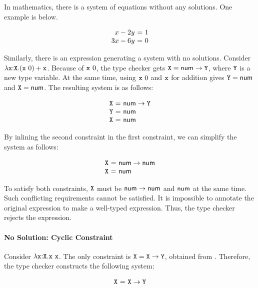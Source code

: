 In mathematics, there is a system of equations without any solutions. One
example is below.

\[
\begin{array}{r@{~}c@{~}l}
  x - 2y &=& 1 \\
  3x - 6y &=& 0 \\
\end{array}
\]

Similarly, there is an expression generating a system with no solutions.
Consider $\lambda\texttt{x}{:}\texttt{X}.(\texttt{x}\ 0)+\texttt{x}$. Because of
$\texttt{x}\ 0$, the type checker gets $\texttt{X}=\textsf{num}\rightarrow\texttt{Y}$, where $\texttt{Y}$
is a new type variable. At the same time, using $\texttt{x}\ 0$ and $\texttt{x}$ for
addition gives $\texttt{Y}=\textsf{num}$ and $\texttt{X}=\textsf{num}$. The resulting system is as follows:

\[
\begin{array}{r@{~}c@{~}l}
  \cX &=& \tarrow{\tnum}{\cY} \\
  \cY &=& \tnum \\
  \cX &=& \tnum \\
\end{array}
\]

By inlining the second constraint in the first constraint, we can simplify the
system as follows:

\[
\begin{array}{r@{~}c@{~}l}
  \cX &=& \tarrow{\tnum}{\tnum} \\
  \cX &=& \tnum \\
\end{array}
\]

To satisfy both constraints, $\texttt{X}$ must be $\textsf{num}\rightarrow\textsf{num}$ and $\textsf{num}$
at the same time. Such conflicting requirements cannot be satisfied. It is
impossible to annotate the original expression to make a well-typed \plang
expression. Thus, the type checker rejects the expression.

\paragraph{No Solution: Cyclic Constraint}

Consider $\lambda\texttt{x}{:}\texttt{X}.\texttt{x}\ \texttt{x}$. The only constraint is
$\texttt{X}=\texttt{X}\rightarrow\texttt{Y}$, obtained from \eapp{\cx}{\cx}. Therefore, the type
checker constructs the following system:

\[
\begin{array}{r@{~}c@{~}l}
  \cX &=& \tarrow{\cX}{\cY} \\
\end{array}
\]

